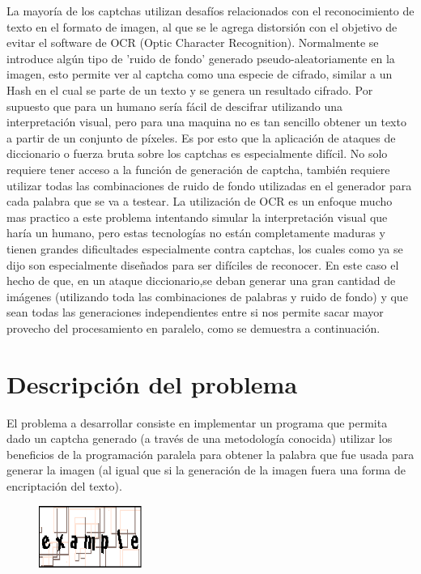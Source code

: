 \documentclass[conference]{IEEEtran}
\begin{document}
La mayoría de los captchas utilizan desafíos relacionados con el reconocimiento de texto en el formato de imagen, al que se le agrega distorsión con el objetivo de evitar el software de OCR (Optic Character Recognition). Normalmente se introduce algún tipo de 'ruido de fondo' generado pseudo-aleatoriamente en la imagen, esto permite ver al captcha como una especie de cifrado, similar a un Hash en el cual se parte de un texto y se genera un resultado cifrado. Por supuesto que para un humano sería fácil de descifrar utilizando una interpretación visual, pero para una maquina no es tan sencillo obtener un texto a partir de un conjunto de píxeles. Es por esto que la aplicación de ataques de diccionario o fuerza bruta sobre los captchas es especialmente difícil. No solo requiere tener acceso a la función de generación de captcha, también requiere utilizar todas las combinaciones de ruido de fondo utilizadas en el generador para cada palabra que se va a testear. La utilización de OCR es un enfoque mucho mas practico a este problema intentando simular la interpretación visual que haría un humano, pero estas tecnologías no están completamente maduras y tienen grandes dificultades especialmente contra captchas, los cuales como ya se dijo son especialmente diseñados para ser difíciles de reconocer. En este caso el hecho de que, en un ataque diccionario,se deban generar una gran cantidad de imágenes (utilizando toda las combinaciones de palabras y ruido de fondo) y que sean todas las generaciones independientes entre si nos permite sacar mayor provecho del procesamiento en paralelo, como se demuestra a continuación.

\section{Descripción del problema}

El problema a desarrollar consiste en implementar un programa que permita dado un captcha generado (a través de una metodología conocida) utilizar los beneficios de la programación paralela para obtener la palabra que fue usada para generar la imagen (al igual que si la generación de la imagen fuera una forma de encriptación del texto).

\begin{figure}[h]
  \centering
   \includegraphics[width=0.3\textwidth]{Captura.PNG}
 \end{figure}
\end{document}
